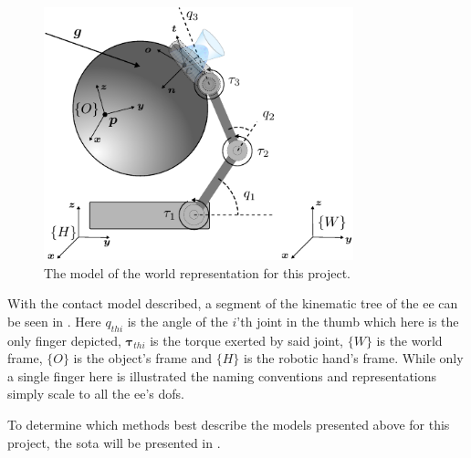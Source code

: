
\begin{figure}[h]
	\begin{small}
		\begin{center}
			\includegraphics[width=0.8\textwidth]{chapters/modeling/fig/kinematic-tree-manipulator-crop.pdf}
		\end{center}
		\caption{The model of the world representation for this project.}
		\label{fig:full-system-model}
	\end{small}
\end{figure}

With the contact model described, a segment of the kinematic tree of the \gls{ee} can be seen in . Here $q_{thi}$ is the angle of the $i$'th joint in the thumb which here is the only finger depicted, $\boldsymbol{\tau}_{thi}$ is the torque exerted by said joint, $\{W\}$ is the world frame, $\{O\}$ is the object's frame and $\{H\}$ is the robotic hand's frame. While only a single finger here is illustrated the naming conventions and representations simply scale to all the \gls{ee}'s \gls{dof}s.\medskip

To determine which methods best describe the models presented above for this project, the \gls{sota} will be presented in .

